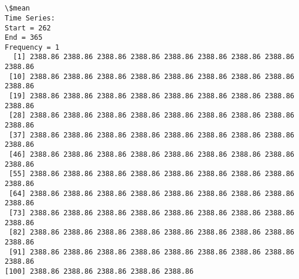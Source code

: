 \documentclass[11pt]{article}
\begin{document}
    \begin{center}
    \end{center}
    { \hspace*{\fill} \\}
    
    \begin{center}
    \end{center}
    { \hspace*{\fill} \\}
    
    \begin{Verbatim}[commandchars=\\\{\}]
\$mean
Time Series:
Start = 262 
End = 365 
Frequency = 1 
  [1] 2388.86 2388.86 2388.86 2388.86 2388.86 2388.86 2388.86 2388.86 2388.86
 [10] 2388.86 2388.86 2388.86 2388.86 2388.86 2388.86 2388.86 2388.86 2388.86
 [19] 2388.86 2388.86 2388.86 2388.86 2388.86 2388.86 2388.86 2388.86 2388.86
 [28] 2388.86 2388.86 2388.86 2388.86 2388.86 2388.86 2388.86 2388.86 2388.86
 [37] 2388.86 2388.86 2388.86 2388.86 2388.86 2388.86 2388.86 2388.86 2388.86
 [46] 2388.86 2388.86 2388.86 2388.86 2388.86 2388.86 2388.86 2388.86 2388.86
 [55] 2388.86 2388.86 2388.86 2388.86 2388.86 2388.86 2388.86 2388.86 2388.86
 [64] 2388.86 2388.86 2388.86 2388.86 2388.86 2388.86 2388.86 2388.86 2388.86
 [73] 2388.86 2388.86 2388.86 2388.86 2388.86 2388.86 2388.86 2388.86 2388.86
 [82] 2388.86 2388.86 2388.86 2388.86 2388.86 2388.86 2388.86 2388.86 2388.86
 [91] 2388.86 2388.86 2388.86 2388.86 2388.86 2388.86 2388.86 2388.86 2388.86
[100] 2388.86 2388.86 2388.86 2388.86 2388.86


\end{Verbatim}
\end{document}
